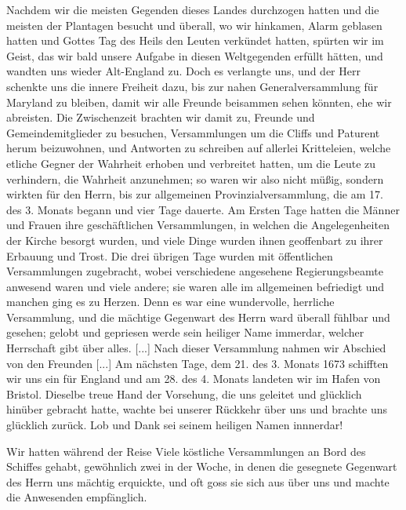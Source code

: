 Nachdem wir die meisten Gegenden dieses Landes durchzogen
hatten und die meisten der Plantagen besucht und überall, wo wir
hinkamen, Alarm geblasen hatten und Gottes Tag des Heils
den Leuten verkündet hatten, spürten wir im Geist, das wir
bald unsere Aufgabe in diesen Weltgegenden erfüllt hätten, und
wandten uns wieder Alt-England zu. Doch es verlangte uns,
und der Herr schenkte uns die innere Freiheit dazu, bis zur
nahen Generalversammlung 
für Maryland zu bleiben, damit wir
alle Freunde beisammen sehen könnten, ehe wir abreisten. Die
Zwischenzeit brachten wir damit zu, Freunde und Gemeindemitglieder
zu besuchen, Versammlungen um die Cliffs und Paturent herum
beizuwohnen, und Antworten zu schreiben auf allerlei Kritteleien,
welche etliche Gegner der Wahrheit erhoben und verbreitet hatten,
um die Leute zu verhindern, die Wahrheit anzunehmen; so waren
wir also nicht müßig, sondern wirkten für den Herrn, bis zur
allgemeinen Provinzialversammlung, die am 17. des 3. Monats
begann und vier Tage dauerte. Am Ersten Tage hatten die
Männer und Frauen ihre geschäftlichen Versammlungen, in welchen
die Angelegenheiten der Kirche besorgt wurden, und viele Dinge
wurden ihnen geoffenbart zu ihrer Erbauung und Trost. Die
drei übrigen Tage wurden mit öffentlichen 
Versammlungen zugebracht, 
wobei verschiedene angesehene Regierungsbeamte anwesend
waren und viele andere; sie waren alle im allgemeinen befriedigt
und manchen ging es zu Herzen. Denn es war eine wundervolle,
herrliche Versammlung, und die mächtige Gegenwart des Herrn
ward überall fühlbar und gesehen; gelobt und gepriesen werde
sein heiliger Name immerdar, welcher Herrschaft gibt über alles.
[...] Nach dieser Versammlung nahmen wir Abschied von den
Freunden [...] Am nächsten Tage, dem 21. des 3. Monats
1673 schifften wir uns ein für England und am 28. des 4. Monats
landeten wir im Hafen von Bristol. Dieselbe treue Hand der
Vorsehung, die uns geleitet und glücklich hinüber gebracht hatte,
wachte bei unserer Rückkehr über uns und brachte uns glücklich
zurück. Lob und Dank sei seinem heiligen Namen innnerdar!

Wir hatten während der Reise Viele köstliche Versammlungen
an Bord des Schiffes gehabt, gewöhnlich zwei in der Woche, in
denen die gesegnete Gegenwart des Herrn uns mächtig erquickte,
und oft goss sie sich aus über uns und machte die Anwesenden
empfänglich.

